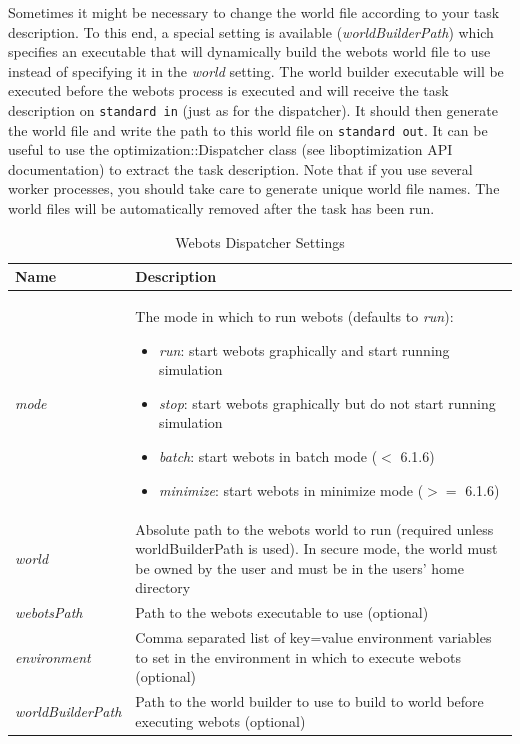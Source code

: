 \documentclass{report}
\begin{document}
Sometimes it might be necessary to change the world file according to your task
description. To this end, a special setting is available (\textit{worldBuilderPath})
which specifies an executable that will dynamically build the webots world
file to use instead of specifying it in the \textit{world} setting. The
world builder executable will be executed before the webots process is executed
and will receive the task description on \verb!standard in!
(just as for the dispatcher). It should then generate the world file and
write the path to this world file on \verb!standard out!. It can be useful
to use the optimization::Dispatcher class (see liboptimization API
documentation) to extract the task description. Note that if you use several
worker processes, you should take care to generate unique world file names.
The world files will be automatically removed after the task has been run.

\begin{table}[h!tb]\caption{Webots Dispatcher Settings}\label{tab:webots_settings}\vspace{0.1in}
	\centering

	\begin{tabular}{p{3cm} p{12cm}}
		\toprule
		\textbf{Name} & \textbf{Description} \\
		\midrule
		\textit{mode} & The mode in which to run webots (defaults to \textit{run}):
		\begin{itemize}
			\item \textit{run}: start webots graphically and start running simulation
			\item \textit{stop}: start webots graphically but do not start running simulation
			\item \textit{batch}: start webots in batch mode ($<$ 6.1.6)
			\item \textit{minimize}: start webots in minimize mode ($>=$ 6.1.6)
		\end{itemize} \\
		\textit{world} & Absolute path to the webots world to run (required
		                 unless worldBuilderPath is used). In secure mode, the
		                 world must be owned by the user and must be in
		the users' home directory \\
		\textit{webotsPath} & Path to the webots executable to use (optional) \\
		\textit{environment} & Comma separated list of key=value environment variables
		              to set in the environment in which to execute webots
		              (optional) \\
		\textit{worldBuilderPath} & Path to the world builder to use to build to world
		                   before executing webots (optional) \\
		\bottomrule
	\end{tabular}
\end{table}
\end{document}
